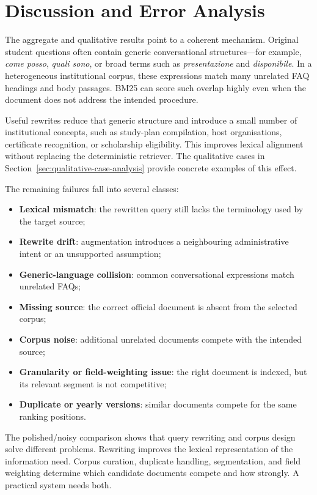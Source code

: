 

\section{Discussion and Error Analysis}

The aggregate and qualitative results point to a coherent mechanism. Original student questions often contain generic conversational structures---for example, \emph{come posso}, \emph{quali sono}, or broad terms such as \emph{presentazione} and \emph{disponibile}. In a heterogeneous institutional corpus, these expressions match many unrelated FAQ headings and body passages. BM25 can score such overlap highly even when the document does not address the intended procedure.

Useful rewrites reduce that generic structure and introduce a small number of institutional concepts, such as study-plan compilation, host organisations, certificate recognition, or scholarship eligibility. This improves lexical alignment without replacing the deterministic retriever. The qualitative cases in Section~\ref{sec:qualitative-case-analysis} provide concrete examples of this effect.

The remaining failures fall into several classes:

\begin{itemize}
    \item \textbf{Lexical mismatch}: the rewritten query still lacks the terminology used by the target source;
    \item \textbf{Rewrite drift}: augmentation introduces a neighbouring administrative intent or an unsupported assumption;
    \item \textbf{Generic-language collision}: common conversational expressions match unrelated FAQs;
    \item \textbf{Missing source}: the correct official document is absent from the selected corpus;
    \item \textbf{Corpus noise}: additional unrelated documents compete with the intended source;
    \item \textbf{Granularity or field-weighting issue}: the right document is indexed, but its relevant segment is not competitive;
    \item \textbf{Duplicate or yearly versions}: similar documents compete for the same ranking positions.
\end{itemize}

The polished/noisy comparison shows that query rewriting and corpus design solve different problems. Rewriting improves the lexical representation of the information need. Corpus curation, duplicate handling, segmentation, and field weighting determine which candidate documents compete and how strongly. A practical system needs both.


